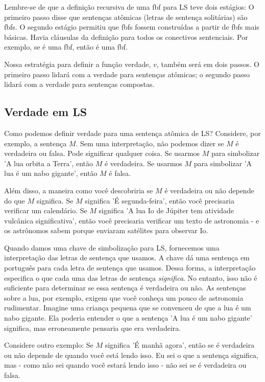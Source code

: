 Lembre-se de que a definição recursiva de uma fbf para LS teve dois estágios: O primeiro passo disse que sentenças atômicas (letras de sentença solitárias) são fbfs. O segundo estágio permitiu que fbfs fossem construídas a partir de fbfs mais básicas. Havia cláusulas da definição para todos os conectivos sentenciais. Por exemplo, se  é uma fbf, então \enot{} é uma fbf.

Nossa estratégia para definir a função verdade, $v$, também será em dois passos. O primeiro passo lidará com a verdade para sentenças atômicas; o segundo passo lidará com a verdade para sentenças compostas.

\subsection{Verdade em LS}
Como podemos definir verdade para uma sentença atômica de LS? Considere, por exemplo, a sentença $M$. Sem uma interpretação, não podemos dizer se $M$ é verdadeira ou falsa. Pode significar qualquer coisa. Se usarmos $M$ para simbolizar 'A lua orbita a Terra', então $M$ é verdadeira. Se usarmos $M$ para simbolizar 'A lua é um nabo gigante', então $M$ é falsa.

Além disso, a maneira como você descobriria se $M$ é verdadeira ou não depende do que $M$ significa. Se $M$ significa 'É segunda-feira', então você precisaria verificar um calendário. Se $M$ significa 'A lua Io de Júpiter tem atividade vulcânica significativa', então você precisaria verificar um texto de astronomia - e os astrônomos sabem porque enviaram satélites para observar Io.

Quando damos uma chave de simbolização para LS, fornecemos uma {interpretação} das letras de sentença que usamos. A chave dá uma sentença em português para cada letra de sentença que usamos. Dessa forma, a interpretação especifica o que cada uma das letras de sentença \emph{significa}. No entanto, isso não é suficiente para determinar se essa sentença é verdadeira ou não. As sentenças sobre a lua, por exemplo, exigem que você conheça um pouco de astronomia rudimentar. Imagine uma criança pequena que se convenceu de que a lua é um nabo gigante. Ela poderia entender o que a sentença 'A lua é um nabo gigante' significa, mas erroneamente pensaria que era verdadeira.

Considere outro exemplo: Se $M$ significa 'É manhã agora', então se é verdadeira ou não depende de quando você está lendo isso. Eu sei o que a sentença significa, mas - como não sei quando você estará lendo isso - não sei se é verdadeira ou falsa.

